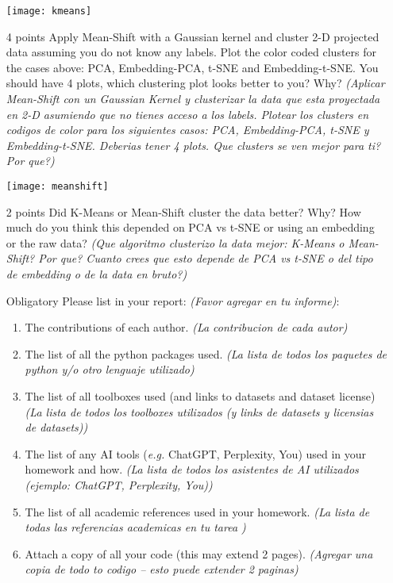 \documentclass{article}
\begin{document}
\begin{enumerate}
        \texttt{[image: kmeans]}
        \item [4 points] Apply Mean-Shift with a Gaussian kernel and cluster 2-D projected data assuming you do not know any labels. Plot the color coded clusters for the cases above: PCA, Embedding-PCA, t-SNE and Embedding-t-SNE. You should have 4 plots, which clustering plot looks better to you? Why? \textit{(Aplicar Mean-Shift con un Gaussian Kernel y clusterizar la data que esta proyectada en 2-D asumiendo que no tienes acceso a los labels. Plotear los clusters en codigos de color para los siguientes casos: PCA, Embedding-PCA, t-SNE y Embedding-t-SNE. Deberias tener 4 plots. Que clusters se ven mejor para ti? Por que?)}

        \texttt{[image: meanshift]}
        \item[2 points] Did K-Means or Mean-Shift cluster the data better? Why? How much do you think this depended on PCA vs t-SNE or using an embedding or the raw data? \textit{(Que algoritmo clusterizo la data mejor: K-Means o Mean-Shift? Por que? Cuanto crees que esto depende de PCA vs t-SNE o del tipo de embedding o de la data en bruto?)}


        \item [Obligatory] Please list in your report: \textit{(Favor agregar en tu informe)}:
        \begin{enumerate}
            \item The contributions of each author. \textit{(La contribucion de cada autor)}
            \item The list of all the python packages used. \textit{(La lista de todos los paquetes de python y/o otro lenguaje utilizado)}
            \item The list of all toolboxes used (and links to datasets and dataset license) \textit{(La lista de todos los toolboxes utilizados (y links de datasets y licensias de datasets))}
            \item The list of any AI tools (\textit{e.g.} ChatGPT, Perplexity, You) used in your homework and how. \textit{(La lista de todos los asistentes de AI utilizados (ejemplo: ChatGPT, Perplexity, You))}
            \item The list of all academic references used in your homework. \textit{(La lista de todas las referencias academicas en tu tarea )}
            \item Attach a copy of all your code (this may extend 2 pages). \textit{(Agregar una copia de todo to codigo -- esto puede extender 2 paginas)}
        \end{enumerate}
    \end{enumerate}
\end{document}
